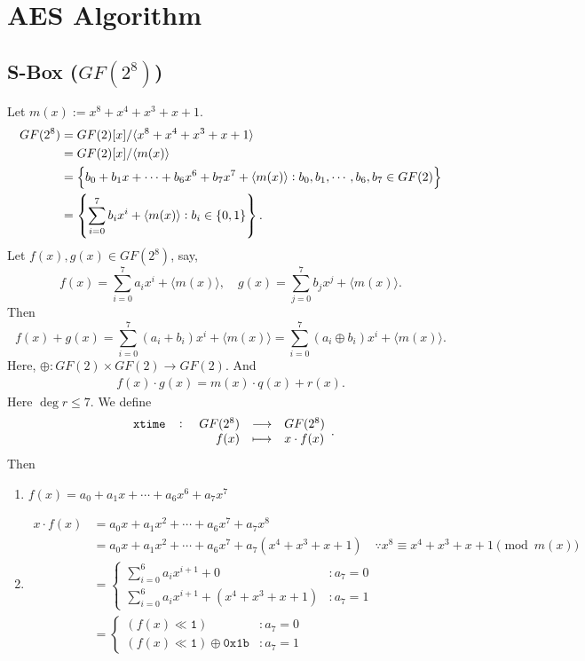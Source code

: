 \chapter{AES Algorithm}

\section{S-Box ($GF(2^8)$)}

Let $m(x):=x^8+x^4+x^3+x+1$.
\begin{align*}
	GF(2^8)&=GF(2)[x]/\langle x^8+x^4+x^3+x+1\rangle \\
	&=GF(2)[x]/\langle m(x)\rangle \\
	&=\set{b_0+b_1x+\cdots+b_6x^6+b_7x^7+\langle m(x)\rangle:b_0,b_1,\cdots, b_6,b_7\in GF(2)}\\
	&=\set{\sum_{i=0}^7b_ix^i+\langle m(x)\rangle:b_i\in\set{0,1}}.
\end{align*}
Let $f(x),g(x)\in GF(2^8)$, say, \[
f(x)=\sum_{i=0}^7a_ix^i+\langle m(x)\rangle,\quad g(x)=\sum_{j=0}^7b_jx^j+\langle m(x)\rangle.
\] Then
\[
f(x)+g(x)=\sum_{i=0}^7(a_i+b_i)x^i+\langle m(x)\rangle=\sum_{i=0}^7(a_i\oplus b_i)x^i+\langle m(x)\rangle.
\] Here, $\oplus:GF(2)\times GF(2)\to GF(2)$. And \begin{align*}
	f(x)\cdot g(x)=m(x)\cdot q(x) + r(x).
\end{align*} Here $\deg r \leq 7$.
\newpage
We define \[
\fullfunction{\texttt{xtime}}{GF(2^8)}{GF(2^8)}{f(x)}{x\cdot f(x)}.
\]
Then \begin{enumerate}
	\item $f(x) = a_0 + a_1x + \cdots + a_6x^6 + a_7x^7$
	\item \begin{align*}
		x\cdot f(x) &= a_0x + a_1x^2 + \cdots + a_6x^7 + a_7x^8 \\
		&= a_0x + a_1x^2 + \cdots + a_6x^7 + a_7(x^4+x^3+x+1)\quad\because x^8\equiv x^4+x^3+x+1\pmod{m(x)} \\
		&=\begin{cases}
			\sum_{i=0}^6a_ix^{i+1} + 0 &:a_7=0\\
			\sum_{i=0}^6a_ix^{i+1} + (x^4+x^3+x+1) &:a_7=1
		\end{cases} \\
		&=\begin{cases}
			(f(x) \ll \texttt{1}) &:a_7=0\\
			(f(x) \ll \texttt{1}) \oplus \texttt{0x1b} &:a_7=1
		\end{cases}
	\end{align*}
\end{enumerate}

